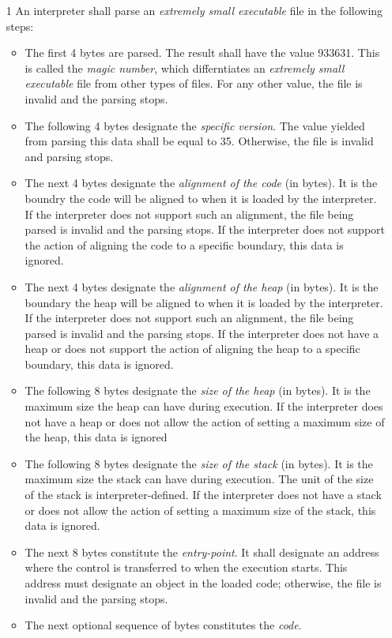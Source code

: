 \documentclass[a4paper]{article}
\begin{document}
    \begin{enumerate}
        \item[1 ] An interpreter shall parse an \emph{extremely small executable} file in the following steps:
            \begin{itemize}
                \item The first 4 bytes are parsed. The result shall have the value 933631. This is called the \emph{magic number}, which differntiates an \emph{extremely small executable} file from other types of files. For any other value, the file is invalid and the parsing stops.
                \item The following 4 bytes designate the \emph{specific version}. The value yielded from parsing this data shall be equal to 35. Otherwise, the file is invalid and parsing stops.
                \item The next 4 bytes designate the \emph{alignment of the code} (in bytes). It is the boundry the code will be aligned to when it is loaded by the interpreter. If the interpreter does not support such an alignment, the file being parsed is invalid and the parsing stops. If the interpreter does not support the action of aligning the code to a specific boundary, this data is ignored.
                \item The next 4 bytes designate the \emph{alignment of the heap} (in bytes). It is the boundary the heap will be aligned to when it is loaded by the interpreter. If the interpreter does not support such an alignment, the file being parsed is invalid and the parsing stops. If the interpreter does not have a heap or does not support the action of aligning the heap to a specific boundary, this data is ignored.
                \item The following 8 bytes designate the \emph{size of the heap} (in bytes). It is the maximum size the heap can have during execution. If the interpreter does not have a heap or does not allow the action of setting a maximum size of the heap, this data is ignored
                \item The following 8 bytes designate the \emph{size of the stack} (in bytes). It is the maximum size the stack can have during execution. The unit of the size of the stack is interpreter-defined. If the interpreter does not have a stack or does not allow the action of setting a maximum size of the stack, this data is ignored.
                \item The next 8 bytes constitute the \emph{entry-point}. It shall designate an address where the control is transferred to when the execution starts. This address must designate an object in the loaded code; otherwise, the file is invalid and the parsing stops.
                \item The next optional sequence of bytes constitutes the \emph{code}.
            \end{itemize}
    \end{enumerate}
\end{document}
